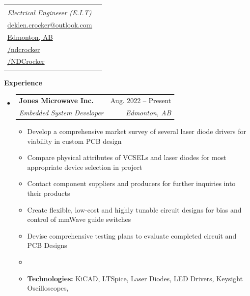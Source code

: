 \documentclass[letterpaper,12pt]{article}[leftmargin=*]
\makeatletter
\def \fullname {N. Deklen Crocker}
\def \subtitle {Electrical Engineeer (E.I.T)}
\def \linkedinicon {\faLinkedin}
\def \linkedinlink {https://linkedin.com/in/ndcrocker/}
\def \linkedintext {/ndcrocker}
\def \phoneicon {\faPhone}
\def \phonetext {+1 (825) 333-4907}
\def \emailicon {\faEnvelope}
\def \emaillink {mailto:deklen.crocker@outlook.com}
\def \emailtext {deklen.crocker@outlook.com}
\def \githubicon {\faGithub}
\def \githublink {https://github.com/NDCrocker}
\def \githubtext {/NDCrocker}
\def \addyicon {\faHome}
\def \addylink {} %
\def \addytext {Edmonton, AB}
\def \headertype {\singlecol} %
\def \entryspacing {-0pt}
\def \linkedin {\linkedinicon \hspace{3pt}\href{\linkedinlink}{\linkedintext}}
\def \phone {\phoneicon \hspace{3pt}{ \phonetext}}
\def \email {\emailicon \hspace{3pt}\href{\emaillink}{\emailtext}}
\def \github {\githubicon \hspace{3pt}\href{\githublink}{\githubtext}}
\def \addy {\addyicon \hspace{3pt}\href{\addylink}{\addytext}}
\renewcommand{\section}[2]{\vspace{5pt}
  \colorbox{secondary}{\color{white}\raggedbottom\normalsize\textbf{{#1}{\hspace{7pt}#2}}}
}
\newcommand{\resumeEntryStart}{\begin{itemize}[leftmargin=2.5mm]}
\newcommand{\resumeEntryEnd}{\end{itemize}\vspace{\entryspacing}}
\newcommand{\resumeItemListStart}{\begin{itemize}[leftmargin=4.5mm]}
\newcommand{\resumeItemListEnd}{\end{itemize}}
\newcommand{\resumeItem}[1]{
  \item\small{
    {#1 \vspace{-2pt}}
  }
}
\newcommand{\resumeEntryTSDL}[4]{
  \vspace{-1pt}\item[]
    \begin{tabularx}{0.97\textwidth}{X@{\hspace{60pt}}r}
      \textbf{\color{primary}#1} & {\firabook\color{accent}\small#2} \\
      \textit{\color{accent}\small#3} & \textit{\color{accent}\small#4} \\
    \end{tabularx}\vspace{-6pt}
}
\newcommand{\doublecol}[6]{
  \begin{tabularx}{\textwidth}{Xr}
    {
      \begin{tabular}[c]{l}
        \fontsize{35}{45}\selectfont{\color{primary}{{\textbf{\fullname}}}} \\
        {\textit{\subtitle}} %
      \end{tabular}
    } & {
      \begin{tabular}[c]{l@{\hspace{1.5em}}l}
        {\small#4} & {\small#1} \\
        {\small#5} & {\small#2} \\
        {\small#6} & {\small#3}
      \end{tabular}
    }
  \end{tabularx}
}
\newcommand{\singlecol}[6]{
  \begin{tabularx}{\textwidth}{Xr}
    {
      \begin{tabular}[b]{l}
        \fontsize{35}{45}\selectfont{\color{primary}{{\textbf{\fullname}}}} \\
        {\textit{\subtitle}} %
      \end{tabular}
    } & {
      \begin{tabular}[c]{l}
        {\small#1} \\
        {\small#2} \\
        {\small#3} \\
        {\small#4} \\
        {\small#5} \\
        {\small#6}
      \end{tabular}
    }
  \end{tabularx}
}
\makeatother
\begin{document}


\headertype{\phone}{\email}{\addy}{\linkedin}{\github}{} %
\vspace{-25pt} %

\section{\faPieChart}{Experience}

  \resumeEntryStart
    \resumeEntryTSDL
      {Jones Microwave Inc.}{Aug. 2022 -- Present}
      {Embedded System Developer}{Edmonton, AB}
    \resumeItemListStart
      \resumeItem {Develop a comprehensive market survey of several laser diode drivers for viability in custom PCB design}
      \resumeItem {Compare physical attributes of VCSELs and laser diodes for most appropriate device selection in project}
      \resumeItem {Contact component suppliers and producers for further inquiries into their products}
      \resumeItem {Create flexible, low-cost and highly tunable circuit designs for bias and control of mmWave guide switches}
      \resumeItem {Devise comprehensive testing plans to evaluate completed circuit and PCB Designs}
      \resumeItem {}
      \resumeItem {\textbf{Technologies:} KiCAD, LTSpice, Laser Diodes, LED Drivers, Keysight Oscilloscopes, }
    \resumeItemListEnd
  \resumeEntryEnd

\end{document}
